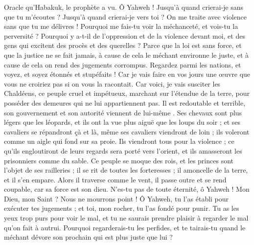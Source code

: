 \begin{multicols}{2}
\VerseOne{}Oracle qu’Habakuk, le prophète a vu.
Ô Yahweh ! Jusqu’à quand crierai-je sans que tu m'écoutes ? Jusqu'à quand crierai-je vers toi ? On me traite avec violence sans que tu me délivres !
Pourquoi me fais-tu voir la méchanceté, et vois-tu la perversité ? Pourquoi y a-t-il de l’oppression et de la violence devant moi, et des gens qui excitent des procès et des querelles ?
Parce que la loi est sans force, et que la justice ne se fait jamais, à cause de cela le méchant environne le juste, et à cause de cela on rend des jugements corrompus.
Regardez parmi les nations, et voyez, et soyez étonnés et stupéfaits ! Car je vais faire en vos jours une œuvre que vous ne croiriez pas si on vous la racontait.
Car voici, je vais susciter les Chaldéens, ce peuple cruel et impétueux, marchant sur l'étendue de la terre, pour posséder des demeures qui ne lui appartiennent pas.
Il est redoutable et terrible, son gouvernement et son autorité viennent de lui-même .
Ses chevaux sont plus légers que les léopards, et ils ont la vue plus aiguë que les loups du soir ; et ses cavaliers se répandront çà et là, même ses cavaliers viendront de loin ; ils voleront comme un aigle qui fond sur sa proie.
Ils viendront tous pour la violence ; ce qu'ils engloutiront de leurs regards sera porté vers l'orient, et ils amasseront les prisonniers comme du sable.
Ce peuple se moque des rois, et les princes sont l’objet de ses railleries ; il se rit de toutes les forteresses ; il amoncelle de la terre, et il s’en empare.
Alors il traverse comme le vent, il passe outre et se rend coupable, car sa force est son dieu.
N'es-tu pas de toute éternité, ô Yahweh ! Mon Dieu, mon Saint ? Nous ne mourrons point ! Ô Yahweh, tu l'as établi pour exécuter tes jugements ; et toi, mon rocher, tu l'as fondé pour punir.
Tu as les yeux trop purs pour voir le mal, et tu ne saurais prendre plaisir à regarder le mal qu'on fait à autrui. Pourquoi regarderais-tu les perfides, et te tairais-tu quand le méchant dévore son prochain qui est plus juste que lui ?

\end{multicols}

